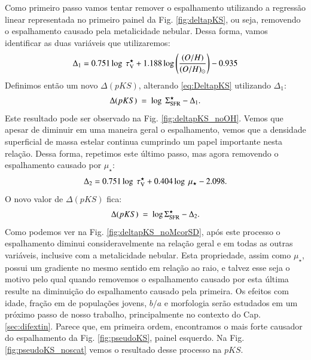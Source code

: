 Como primeiro passo vamos tentar remover o espalhamento utilizando a regressão linear representada
no primeiro painel da Fig. \ref{fig:deltapKS}, ou seja, removendo o espalhamento causado pela
metalicidade nebular. Dessa forma, vamos identificar as duas variáveis que utilizaremos:
\begin{equation}
	\Delta_1 = 0.751 \log\ \tau_{\mathrm{V}}^\star + 1.188 \log \left(\frac{(O/H)}{(O/H)_\odot}\right) - 0.935
	\label{eq:Delta1}
\end{equation}
Definimos então um novo $\Delta(pKS)$, alterando \eqref{eq:DeltapKS} utilizando $\Delta_1$:
\begin{equation}
	\Delta(pKS)\ =\ \log\ \Sigma_{\mathrm{SFR}}^\star - \Delta_1.
\end{equation}
\noindent Este resultado pode ser observado na Fig. \ref{fig:deltapKS_noOH}. Vemos que apesar
de diminuir em uma maneira geral o espalhamento, vemos que a densidade superficial de massa estelar
continua cumprindo um papel importante nesta relação. Dessa forma, repetimos este último passo, mas
agora removendo o espalhamento causado por $\mu_\star$:
\begin{equation}
	\Delta_2 = 0.751 \log\ \tauVS + 0.404 \log\ \mu_\star - 2.098.
	\label{eq:Delta2}
\end{equation}
\noindent O novo valor de $\Delta(pKS)$ fica:
\begin{equation}
	\Delta(pKS)\ =\ \log \Sigma_{\mathrm{SFR}}^\star - \Delta_2.
\end{equation}
\noindent Como podemos ver na Fig. \ref{fig:deltapKS_noMcorSD}, após este processo o
espalhamento diminui consideravelmente na relação geral e em todas as outras variáveis, inclusive
com a metalicidade nebular. Esta propriedade, assim como $\mu_\star$, possui um gradiente no mesmo
sentido em relação ao raio, e talvez esse seja o motivo pelo qual quando removemos o espalhamento
causado por esta última resulte na diminuição do espalhamento causado pela primeira. Os efeitos com
idade, fração em de populações jovens, $b/a$ e morfologia serão estudados em um próximo passo de
nosso trabalho, principalmente no contexto do Cap. \ref{sec:difextin}. Parece que, em primeira
ordem, encontramos o mais forte causador do espalhamento da Fig. \ref{fig:pseudoKS}, painel
esquerdo. Na Fig. \ref{fig:pseudoKS_noscat} vemos o resultado desse processo na $pKS$.

